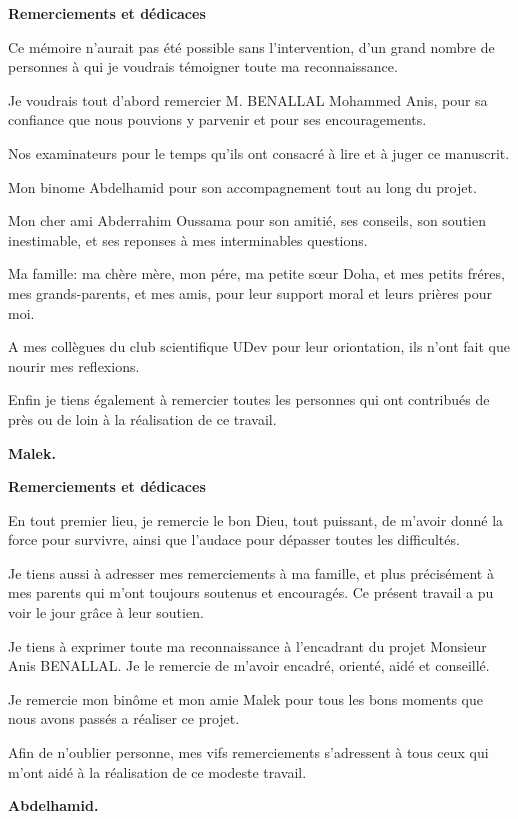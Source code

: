 \newenvironment{acknowledgement}{
  \vspace*{\fill}
  \begin{center}%
    \bfseries Remerciements et dédicaces
  \end{center}}%
  {\vfill}
  
  \thispagestyle{empty}
  
\begin{acknowledgement}

    Ce mémoire n'aurait pas été possible sans l'intervention, d'un grand nombre de personnes à qui je voudrais témoigner toute ma reconnaissance.

    Je voudrais tout d'abord remercier M. BENALLAL Mohammed Anis, pour sa confiance que nous pouvions y parvenir et pour ses encouragements.

    Nos examinateurs  pour le temps qu'ils ont consacré à lire et à juger ce manuscrit.

    Mon binome Abdelhamid pour son accompagnement tout au long du projet.

    Mon cher ami Abderrahim Oussama pour son amitié, ses conseils, son soutien inestimable, et ses reponses à mes interminables questions.

    Ma famille: ma chère mère, mon pére, ma petite sœur Doha, et mes petits fréres, mes grands-parents, et mes amis, pour leur  support moral et  leurs prières  pour moi.

    A mes collègues du club scientifique UDev pour leur oriontation, ils n'ont fait que nourir mes reflexions.

    Enfin  je tiens également à remercier toutes les personnes qui ont contribués de près ou de loin à la réalisation  de ce travail.


\begin{flushright}
\textbf{Malek.}
\end{flushright}
\end{acknowledgement}

\begin{acknowledgement}


  En tout premier lieu, je remercie le bon Dieu, tout puissant, de m'avoir donné la force pour survivre, ainsi que l'audace pour dépasser toutes les difficultés.

  Je tiens aussi à adresser mes remerciements à ma famille, et plus précisément à mes parents qui m'ont toujours soutenus et encouragés. Ce présent travail a pu voir le jour grâce à leur soutien.

  Je tiens à exprimer toute ma reconnaissance à l'encadrant du projet Monsieur Anis BENALLAL. Je le remercie de m'avoir encadré, orienté, aidé et conseillé.

  Je remercie mon binôme et mon amie Malek pour tous les bons moments que nous avons passés a réaliser ce projet.

  Afin de n'oublier personne, mes vifs remerciements s'adressent à tous ceux qui m'ont aidé à la réalisation de ce modeste travail.



\begin{flushright}
\textbf{Abdelhamid.}
\end{flushright}
\end{acknowledgement}

\clearpage